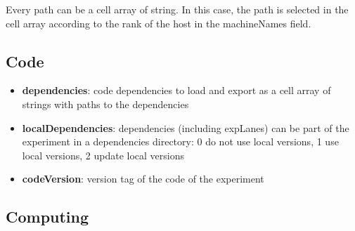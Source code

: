 \documentclass[a4paper,fleqn]{tufte-handout}
\begin{document}
Every path can be a cell array of string. In this case, the path is selected in the cell array according to the rank of the host in the machineNames field.

\subsection{Code}

\begin{itemize}
\item \textbf{dependencies}: code dependencies to load and export as a cell array of strings with paths to the dependencies
\item \textbf{localDependencies}: dependencies (including expLanes) can be part of the experiment in a dependencies directory: 0 do not use local versions, 1 use local versions, 2 update local versions
\item \textbf{codeVersion}: version tag of the code of the experiment
\end{itemize}

\subsection{Computing}
\end{document}
